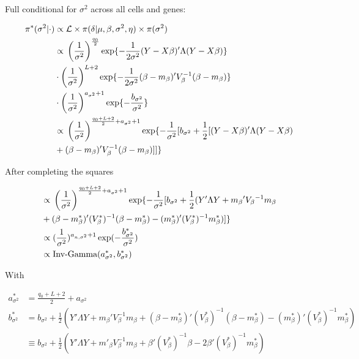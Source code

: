 \begin{Comment}
Full conditional for $\sigma^2$ across all cells and genes:
\begin{fleqn}
\begin{align*}
\pi^*(\sigma^2|\cdot)&\propto{}\mathcal{L}\times\pi(\delta|\mu,\beta,\sigma^2,\eta)\times\pi(\sigma^2)\\
&\propto{}\left(\frac{1}{\sigma^2}\right)^{\frac{q_0}{2}}\exp\lbrace-\frac{1}{2\sigma^2}(Y-X\beta)'\Lambda(Y-X\beta)\rbrace\\
&\cdot\left(\frac{1}{\sigma^2}\right)^{L+2}\exp\lbrace-\frac{1}{2\sigma^2}(\beta-m_\beta{})'V_\beta^{-1}(\beta-m_\beta{})\rbrace\\
&\cdot\left(\frac{1}{\sigma^2}\right)^{a_{\sigma^2}+1}\exp\lbrace-\frac{b_{\sigma^2}}{\sigma^2}\rbrace\\
&\propto{}\left(\frac{1}{\sigma^2}\right)^{\frac{q_0+L+2}{2}+a_{\sigma^2}+1}\exp\lbrace-\frac{1}{\sigma^2}[b_{\sigma^2}+\frac{1}{2}[(Y-X\beta)'\Lambda(Y-X\beta) \\
&+ (\beta-m_\beta{})'V_\beta^{-1}(\beta-m_\beta{})]]\rbrace
\end{align*}
\end{fleqn} 
After completing the squares
\begin{fleqn}
\begin{align*}
&\propto{}\left(\frac{1}{\sigma^2}\right)^{\frac{q_0+L+2}{2}+a_{\sigma^2}+1}\exp\lbrace-\frac{1}{\sigma^2}[b_{\sigma^2}+\frac{1}{2}(Y'\Lambda{}Y+m_\beta{}'V_\beta{}^{-1}m_\beta{}\\
&+(\beta-m^*_{\beta})'(V^*_{\beta})^{-1}(\beta-m^*_{\beta})-(m^*_{\beta})'(V^*_{\beta})^{-1}m^*_{\beta})]\rbrace\\
&\propto{}(\frac{1}{\sigma^2})^{a_{n,\sigma^2}+1}\exp(-\frac{b^*_{\sigma^2}}{\sigma^2})\\
&\propto{}\textnormal{Inv-Gamma}(a^*_{\sigma^2},b^*_{\sigma^2})
\end{align*}
\end{fleqn}
With
\begin{fleqn}
\begin{align*}
a^*_{\sigma^2}&=\frac{q_0+L+2}{2}+a_{\sigma^2}\\
b^*_{\sigma^2}&=b_{\sigma^2}+\frac{1}{2}(Y'\Lambda{}Y+m_\beta'V_\beta^{-1}m_\beta+(\beta-m^*_{\beta})'(V^*_{\beta})^{-1}(\beta-m^*_{\beta})-(m^*_{\beta})'(V^*_{\beta})^{-1}m^*_{\beta})\\
&\equiv{}b_{\sigma^2}+\frac{1}{2}(Y'\Lambda Y+ m'_{\beta} V_\beta^{-1} m_\beta + \beta' (V^*_{\beta})^{-1} \beta - 2 \beta' (V^*_{\beta})^{-1} m^*_{\beta} )
\end{align*}
\end{fleqn}


\end{Comment}
